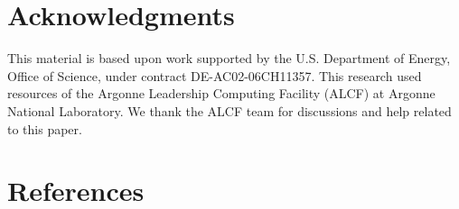 \documentclass[final,5p,times]{elsarticle}
\begin{document}

\section*{Acknowledgments}

This material is based upon work supported by the U.S. Department of Energy, Office of Science, under contract DE-AC02-06CH11357.
This research used resources of the Argonne Leadership Computing Facility (ALCF) at Argonne National Laboratory.
We thank the ALCF team for discussions and help related to this paper.



\section*{References}

 






\end{document}
